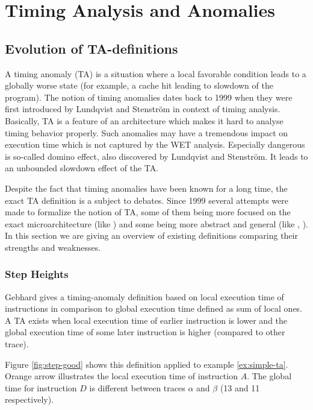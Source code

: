 \chapter{Timing Analysis and Anomalies}

\section{Evolution of TA-definitions}

A timing anomaly (TA) is a situation where a local favorable condition leads to a globally worse state (for example, a cache hit leading to slowdown of the program).  The notion of timing anomalies dates back to 1999 when they were first introduced by Lundqvist and Stenstr\"om \cite{lundqvist_timing_1999} in context of timing analysis. Basically, TA is a feature of an architecture which makes it hard to analyse timing behavior properly. Such anomalies may have a tremendous impact on execution time which is not captured by the WET analysis. Especially dangerous is so-called domino effect, also discovered by Lundqvist and Stenstr\"om. It leads to an unbounded slowdown effect of the TA.

Despite the fact that timing anomalies have been known for a long time, the exact TA definition is a subject to debates. Since 1999 several attempts were made to formalize the notion of TA, some of them being more focused on the exact microarchitecture (like \cite{gruin_minotaur_2023}) and some being more abstract and general (like \cite{binder_definitions_2022}, \cite{hahn_design_2020}). In this section we are giving an overview of existing definitions comparing their strengths and weaknesses.

\subsection{Step Heights}

Gebhard \cite{gebhard_timing_2012} gives a timing-anomaly definition based on local execution time of instructions in comparison to global execution time defined as sum of local ones. A TA exists when local execution time of earlier instruction is lower and the global execution time of some later instruction is higher (compared to other trace).

Figure \ref{fig:step-good} shows this definition applied to example \ref{ex:simple-ta}. Orange arrow illustrates the local execution time of instruction $A$. The global time for instruction $D$ is different between traces $\alpha$ and $\beta$ (13 and 11 respectively).

